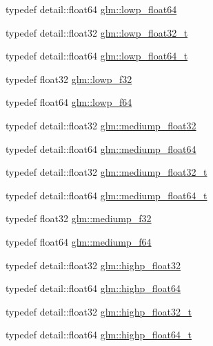 \begin{DoxyCompactItemize}
typedef detail\-::float64 \hyperlink{group__gtc__type__precision_ga32e02689f4e83fb269c9047418536f2c}{glm\-::lowp\-\_\-float64}
\item 
typedef detail\-::float32 \hyperlink{group__gtc__type__precision_gadfb453b23cb820e3e4e766e047c67dab}{glm\-::lowp\-\_\-float32\-\_\-t}
\item 
typedef detail\-::float64 \hyperlink{group__gtc__type__precision_gac9d64f4e69d6c2eade41a848077866b5}{glm\-::lowp\-\_\-float64\-\_\-t}
\item 
typedef float32 \hyperlink{group__gtc__type__precision_ga1b9734de4b4429dc26b1454a2a399b05}{glm\-::lowp\-\_\-f32}
\item 
typedef float64 \hyperlink{group__gtc__type__precision_ga59839f4bf6b97c93b0def577890bbfb8}{glm\-::lowp\-\_\-f64}
\item 
typedef detail\-::float32 \hyperlink{group__gtc__type__precision_ga1b5f74cbeed0c9d42cd57d77609be7ee}{glm\-::mediump\-\_\-float32}
\item 
typedef detail\-::float64 \hyperlink{group__gtc__type__precision_ga9225ae6aed0f90b6eb65bf8d466199c1}{glm\-::mediump\-\_\-float64}
\item 
typedef detail\-::float32 \hyperlink{group__gtc__type__precision_gacbd406715148db96c9d9d2a2ef6460de}{glm\-::mediump\-\_\-float32\-\_\-t}
\item 
typedef detail\-::float64 \hyperlink{group__gtc__type__precision_ga97a0747b103eb5ef320a91888de52f51}{glm\-::mediump\-\_\-float64\-\_\-t}
\item 
typedef float32 \hyperlink{group__gtc__type__precision_ga3dbba6bd06a546d7a11d1c09c2f04b1a}{glm\-::mediump\-\_\-f32}
\item 
typedef float64 \hyperlink{group__gtc__type__precision_gabd273bd38ea5e013aeec9ffd2b2591fb}{glm\-::mediump\-\_\-f64}
\item 
typedef detail\-::float32 \hyperlink{group__gtc__type__precision_ga91af7513c1102410646f2c435ca29be5}{glm\-::highp\-\_\-float32}
\item 
typedef detail\-::float64 \hyperlink{group__gtc__type__precision_gab871a78c548d2fa53e1e8ec64a46eee7}{glm\-::highp\-\_\-float64}
\item 
typedef detail\-::float32 \hyperlink{group__gtc__type__precision_ga4e16a7818d09e2da3b81765999f23928}{glm\-::highp\-\_\-float32\-\_\-t}
\item 
typedef detail\-::float64 \hyperlink{group__gtc__type__precision_gae8b3b2ace5be2a61c6bf63f12643fa15}{glm\-::highp\-\_\-float64\-\_\-t}
\item 

\end{DoxyCompactItemize}
